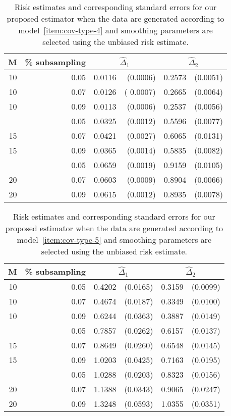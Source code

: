 \begin{table}[H] \label{table:simulation-2-sigma-4}
\centering
\begin{tabular}{rrrrrr}
M & \% subsampling &  \multicolumn{2}{c}{$\hat{\Delta}_1$}  &  \multicolumn{2}{c}{$\hat{\Delta}_2$} \\ 
 \hline
10 & 0.05 & 0.0116 & (0.0006) & 0.2573 & (0.0051) \\ 
  10 & 0.07 & 0.0126 &( 0.0007) & 0.2665 & (0.0064) \\ 
  10 & 0.09 & 0.0113 & (0.0006) & 0.2537 & (0.0056) \\ 
    \hdashline
  15 & 0.05 & 0.0325 & (0.0012) & 0.5596 & (0.0077) \\ 
  15 & 0.07 & 0.0421 & (0.0027) & 0.6065 & (0.0131) \\ 
  15 & 0.09 & 0.0365 & (0.0014) & 0.5835 & (0.0082) \\ 
    \hdashline
  20 & 0.05 & 0.0659 & (0.0019) & 0.9159 & (0.0105) \\ 
  20 & 0.07 & 0.0603 & (0.0009) & 0.8904 & (0.0066) \\ 
  20 & 0.09 & 0.0615 & (0.0012) & 0.8935 & (0.0078) \\ 
   \hline
\end{tabular}
\caption{Risk estimates and corresponding standard errors for our proposed estimator when the data are generated according to model~\ref{item:cov-type-4}  and smoothing parameters are selected using the unbiased risk estimate.} 
\end{table}
\begin{table}[H] \label{table:simulation-2-sigma-5}
\centering
\begin{tabular}{rrrrrr}
M & \% subsampling &  \multicolumn{2}{c}{$\hat{\Delta}_1$}  &  \multicolumn{2}{c}{$\hat{\Delta}_2$} \\ 
  \hline
10 & 0.05 & 0.4202 & (0.0165) & 0.3159 & (0.0099) \\ 
  10 & 0.07 & 0.4674 & (0.0187) & 0.3349 & (0.0100) \\ 
  10 & 0.09 & 0.6244 & (0.0363) & 0.3887 & (0.0149) \\ 
  \hdashline
  15 & 0.05 & 0.7857 & (0.0262) & 0.6157 & (0.0137) \\ 
  15 & 0.07 & 0.8649 & (0.0260) & 0.6548 & (0.0145) \\ 
  15 & 0.09 & 1.0203 & (0.0425) & 0.7163 & (0.0195) \\ 
    \hdashline
  20 & 0.05 & 1.0288 & (0.0203) & 0.8323 & (0.0156) \\ 
  20 & 0.07 & 1.1388 & (0.0343) & 0.9065 & (0.0247) \\ 
  20 & 0.09 & 1.3248 & (0.0593) & 1.0355 & (0.0351) \\ 
   \hline
\end{tabular}
\caption{Risk estimates and corresponding standard errors for our proposed estimator when the data are generated according to model~\ref{item:cov-type-5} and smoothing parameters are selected using the unbiased risk estimate.} 
\end{table}
